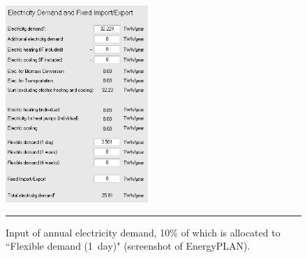 \begin{figure}
	\centering
	\includegraphics[width=0.48\textwidth]{figures/B12_elec_dem.png}
	\rule{0.48\textwidth}{0.5pt} %
	\caption{Input of annual electricity demand, 10\% of which is allocated to ``Flexible demand (1~day)" (screenshot of EnergyPLAN).}
	\label{fig:B12_elec_dem}
\end{figure}